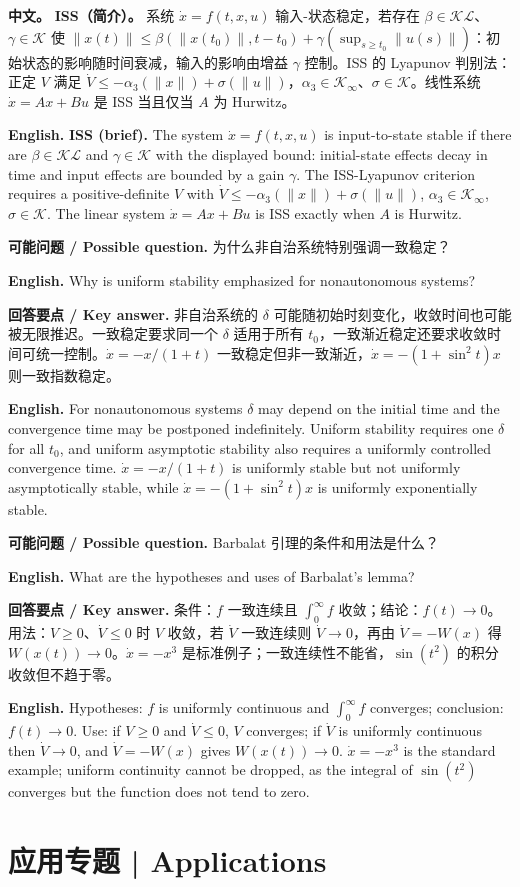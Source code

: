 \documentclass[UTF8,11pt,a4paper]{ctexart}
\newcommand{\EN}[1]{\par\noindent\textbf{English.} #1\par}
\newcommand{\ASK}[4]{\begin{samepage}\par\noindent\textbf{可能问题 / Possible question.} #1\par\EN{#2}\noindent\textbf{回答要点 / Key answer.} #3\par\EN{#4}\smallskip\end{samepage}}
\newcommand{\APS}[2]{\par\noindent\textbf{中文。} #1\par\noindent\textbf{English.} #2\par}
\newcommand{\norm}[1]{\lVert #1\rVert}\newcommand{\abs}[1]{\lvert #1\rvert}
\begin{document}
\APS{\textbf{ISS（简介）。} 系统 $\dot x=f(t,x,u)$ 输入-状态稳定，若存在 $\beta\in\mathcal{KL}$、$\gamma\in\mathcal K$ 使 $\norm{x(t)}\le\beta(\norm{x(t_0)},t-t_0)+\gamma(\sup_{s\ge t_0}\norm{u(s)})$：初始状态的影响随时间衰减，输入的影响由增益 $\gamma$ 控制。ISS 的 Lyapunov 判别法：正定 $V$ 满足 $\dot V\le-\alpha_3(\norm{x})+\sigma(\norm{u})$，$\alpha_3\in\mathcal K_\infty$、$\sigma\in\mathcal K$。线性系统 $\dot x=Ax+Bu$ 是 ISS 当且仅当 $A$ 为 Hurwitz。}{\textbf{ISS (brief).} The system $\dot x=f(t,x,u)$ is input-to-state stable if there are $\beta\in\mathcal{KL}$ and $\gamma\in\mathcal K$ with the displayed bound: initial-state effects decay in time and input effects are bounded by a gain $\gamma$. The ISS-Lyapunov criterion requires a positive-definite $V$ with $\dot V\le-\alpha_3(\norm{x})+\sigma(\norm{u})$, $\alpha_3\in\mathcal K_\infty$, $\sigma\in\mathcal K$. The linear system $\dot x=Ax+Bu$ is ISS exactly when $A$ is Hurwitz.}

\ASK{为什么非自治系统特别强调一致稳定？}{Why is uniform stability emphasized for nonautonomous systems?}{非自治系统的 $\delta$ 可能随初始时刻变化，收敛时间也可能被无限推迟。一致稳定要求同一个 $\delta$ 适用于所有 $t_0$，一致渐近稳定还要求收敛时间可统一控制。$\dot x=-x/(1+t)$ 一致稳定但非一致渐近，$\dot x=-(1+\sin^2t)x$ 则一致指数稳定。}{For nonautonomous systems $\delta$ may depend on the initial time and the convergence time may be postponed indefinitely. Uniform stability requires one $\delta$ for all $t_0$, and uniform asymptotic stability also requires a uniformly controlled convergence time. $\dot x=-x/(1+t)$ is uniformly stable but not uniformly asymptotically stable, while $\dot x=-(1+\sin^2t)x$ is uniformly exponentially stable.}

\ASK{Barbalat 引理的条件和用法是什么？}{What are the hypotheses and uses of Barbalat's lemma?}{条件：$f$ 一致连续且 $\int_0^\infty f$ 收敛；结论：$f(t)\to0$。用法：$V\ge0$、$\dot V\le0$ 时 $V$ 收敛，若 $\dot V$ 一致连续则 $\dot V\to0$，再由 $\dot V=-W(x)$ 得 $W(x(t))\to0$。$\dot x=-x^3$ 是标准例子；一致连续性不能省，$\sin(t^2)$ 的积分收敛但不趋于零。}{Hypotheses: $f$ is uniformly continuous and $\int_0^\infty f$ converges; conclusion: $f(t)\to0$. Use: if $V\ge0$ and $\dot V\le0$, $V$ converges; if $\dot V$ is uniformly continuous then $\dot V\to0$, and $\dot V=-W(x)$ gives $W(x(t))\to0$. $\dot x=-x^3$ is the standard example; uniform continuity cannot be dropped, as the integral of $\sin(t^2)$ converges but the function does not tend to zero.}

\section{应用专题 | Applications}
\end{document}
